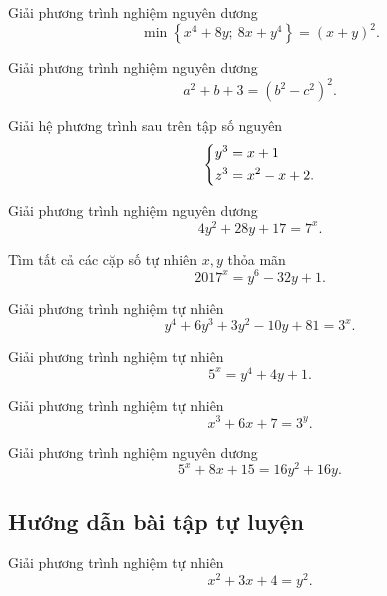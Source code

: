 \begin{btt}
Giải phương trình nghiệm nguyên dương
$$\min \left\{x^{4}+8 y;\  8 x+y^{4}\right\}=(x+y)^{2}.$$
\end{btt}

\begin{btt}
Giải phương trình nghiệm nguyên dương 
\[a^2+b+3=\left ( b^2-c^2 \right )^2.\]
\end{btt}

\begin{btt}
Giải hệ phương trình sau trên tập số nguyên
$$\left\{\begin{aligned}y^3&=x+1 \\ z^3&=x^2-x+2.\end{aligned}\right.$$ 
\end{btt}

\begin{btt}
Giải phương trình nghiệm nguyên dương
\[4y^2+28y+17=7^x.\]
\end{btt}

\begin{btt}
Tìm tất cả các cặp số tự nhiên $x,y$ thỏa mãn
\[2017^x=y^6-32y+1.\]
\end{btt}

\begin{btt}
Giải phương trình nghiệm tự nhiên
$$y^4+6y^3+3y^2-10y+81=3^x.$$
\end{btt}

\begin{btt}
Giải phương trình nghiệm tự nhiên 
$$5^x=y^4+4y+1.$$
\end{btt}

\begin{btt}
Giải phương trình nghiệm tự nhiên
$$x^3+6x+7=3^y.$$
\end{btt}

\begin{btt}
Giải phương trình nghiệm nguyên dương
$$5^x+8x+15=16y^2+16y.$$
\end{btt}


\subsection*{Hướng dẫn bài tập tự luyện}


\begin{gbtt}
Giải phương trình nghiệm tự nhiên
\[x^2+3x+4=y^2.\]
\end{gbtt}

